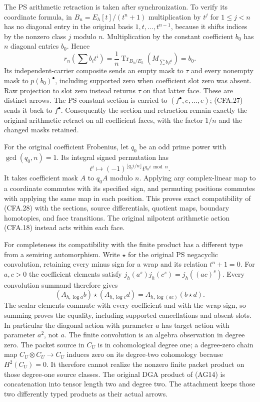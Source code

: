 The PS arithmetic retraction is taken after synchronization.  To verify
its coordinate formula, in $B_n=E_h[t]/(t^n+1)$ multiplication by
$t^j$ for $1\le j<n$ has no diagonal entry in the original basis
$1,t,\ldots,t^{n-1}$, because it shifts indices by the nonzero
class $j$ modulo $n$.  Multiplication by the constant coefficient
$b_0$ has $n$ diagonal entries $b_0$.  Hence
\[
 r_n\left(\sum b_it^i\right)=
 \frac1n\operatorname{Tr}_{B_n/E_h}(M_{\sum b_it^i})=b_0.
                                                               \tag{CFA.27}
\]
Its independent-carrier composite sends an empty mask to $\tau$
and every nonempty mask to $p(b_0)^\bullet$, including supported
zero when coefficient slot zero was absent.  Raw projection to slot
zero instead returns $\tau$ on that latter face.  These are distinct
arrows.  The PS constant section is carried to
$(f^\bullet,e,\ldots,e)$; (CFA.27) sends it back to $f^\bullet$.
Consequently the section and retraction remain exactly the original
arithmetic retract on all coefficient faces, with the factor $1/n$
and the changed masks retained.

For the original coefficient Frobenius, let $q_0$ be an odd prime
power with $\gcd(q_0,n)=1$.  Its integral signed permutation has
\[
 t^i\longmapsto(-1)^{\lfloor q_0i/n\rfloor}t^{q_0i\bmod n}.
                                                               \tag{CFA.28}
\]
It takes coefficient mask $A$ to $q_0A$ modulo $n$.
Applying any complex-linear map to a coordinate commutes with its
specified sign, and permuting positions commutes with applying the
same map in each position.  This proves exact compatibility of
(CFA.28) with the sections, source differentials, quotient maps,
boundary homotopies, and face transitions.  The original nilpotent
arithmetic action (CFA.18) instead acts within each face.

For completeness its compatibility with the finite product has a
different type from a semiring automorphism.  Write $\star$ for the
original PS negacyclic convolution, retaining every minus sign for
a wrap and its relation $t^n+1=0$.  For $a,c>0$ the coefficient
elements satisfy $j_h(a^s)j_h(c^s)=j_h((ac)^s)$.  Every convolution
summand therefore gives
\[
 (A_{h,\log a}b)\star(A_{h,\log c}d)
       =A_{h,\log(ac)}(b\star d).                            \tag{CFA.29}
\]
The scalar elements commute with every coefficient and with the wrap
sign, so summing proves the equality, including supported cancellations
and absent slots.  In particular the diagonal action with parameter
$a$ has target action with parameter $a^2$, not $a$.
The finite convolution is an algebra observation in degree zero.
The packet source in $C_U$ is in cohomological degree one; a degree-zero
chain map $C_U\otimes C_U\to C_U$ induces zero on its degree-two
cohomology because $H^2(C_U)=0$.  It therefore cannot realize the
nonzero finite packet product on those degree-one source classes.
The original DGA product of (AG14) is concatenation into tensor length
two and degree two.  The attachment keeps those two differently typed
products as their actual arrows.

